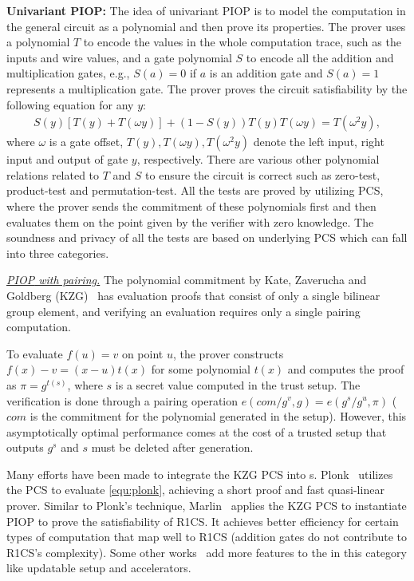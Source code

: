 \documentclass[letterpaper,twocolumn,10pt]{article}
\theoremstyle{definition}
\newcommand{\mypara}[1]{\noindent\textbf{{#1: }}}
\newcommand{\zk}{\text{zk-SNARK}\xspace}
\newcommand{\new}[1]{{#1}\xspace}
\begin{document}
\mypara{Univariant PIOP} The idea of univariant PIOP is to model the computation in the general circuit as a polynomial and then prove its properties. \new{The prover uses a polynomial $T$ to encode the values in the whole computation trace, such as the inputs and wire values, and a gate polynomial $S$ to encode all the addition and multiplication gates, e.g., $S(a)=0$ if $a$ is an addition gate and $S(a)=1$ represents a multiplication gate. The prover proves the circuit satisfiability by the following equation for any $y$:
	\begin{equation}
		\label{equ:plonk}
		\begin{aligned}
			S(y)[T(y)+T(\omega y)] + (1-S(y))T(y)T(\omega y)=T(\omega^{2}y),
		\end{aligned}
	\end{equation}
	where $\omega$ is a gate offset, $T(y),T(\omega y),T(\omega^{2}y)$ denote the left input, right input and output of gate $y$, respectively. There are various other polynomial relations related to $T$ and $S$ to ensure the circuit is correct such as zero-test, product-test and permutation-test. All the tests are proved by utilizing PCS, where the prover sends the commitment of these polynomials first and then evaluates them on the point given by the verifier with zero knowledge. The soundness and privacy of all the tests are based on underlying PCS which can fall into three categories.}

\noindent \underline{\textit{{PIOP} with pairing.}} 
The polynomial commitment by Kate, Zaverucha and Goldberg (KZG)~\cite{KZG10} has evaluation proofs that consist of only a single bilinear group element, and verifying an evaluation requires only a single
pairing computation. \new{To evaluate $f(u)=v$ on point $u$, the prover constructs $f(x)-v=(x-u)t(x)$ for some polynomial $t(x)$ and computes the proof as $\pi=g^{t(s)}$, where $s$ is a secret value computed in the trust setup. The verification is done through a pairing operation $e(com/g^{v},g)=e(g^{s}/g^{u},\pi)$ ($com$ is the commitment for the polynomial generated in the setup).
	However, this asymptotically optimal performance comes at the cost of a trusted setup that outputs $g^{s}$ and $s$ must be deleted after generation. 
	
	Many efforts have been made to integrate the KZG PCS into {\zk}s. Plonk~\cite{gabizon2019plonk} utilizes the PCS to evaluate \autoref{equ:plonk}, achieving a short proof and fast quasi-linear prover.
	Similar to Plonk's technique, Marlin~\cite{chiesa2020marlin} applies the KZG PCS to instantiate PIOP to prove the satisfiability of R1CS. It achieves better efficiency for certain types of computation that map well to R1CS (addition gates do not contribute to R1CS's complexity). Some other works~\cite{bunz2021proofs,campanelli2021lunar,zhang2024efficient,aranha2022eclipse} add more features to the \zk in this category like updatable setup and accelerators.
}
\end{document}
